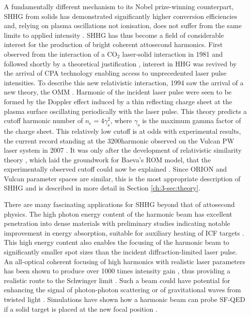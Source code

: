 A fundamentally different mechanism to its Nobel prize-winning counterpart, SHHG from solids has demonstrated significantly higher conversion efficiencies and, relying on plasma oscillations not ionisation, does not suffer from the same limits to applied intensity \cite{teubnerHighorderHarmonicsLaserirradiated2009}. SHHG has thus become a field of considerable interest for the production of bright coherent attosecond harmonics. First observed from the interaction of a CO$_2$ laser-solid interaction in 1981 \cite{carmanVisibleHarmonicEmission1981} and followed shortly by a theoretical justification \cite{bezzeridesPlasmaMechanismUltraviolet1982}, interest in HHG was revived by the arrival of CPA technology enabling access to unprecedented laser pulse intensities. To describe this new relativistic interaction, 1994 saw the arrival of a new theory, the \ac{OMM} \cite{bulanovInteractionUltrashortRelativistically1994}. Harmonic of the incident laser pulse were seen to be formed by the Doppler effect induced by a thin reflecting charge sheet at the plasma surface oscillating periodically with the laser pulse. This theory predicts a cutoff harmonic number of $n_\mathrm{c} = 4\gamma_\mathrm{s}^2 $, where $\gamma_\mathrm{s}$ is the maximum gamma factor of the charge sheet. This relatively low cutoff is at odds with experimental results, the current record standing at the 3200\th harmonic observed on the Vulcan PW laser system in 2007 \cite{dromeyBrightMultikeVHarmonic2007}. It was only after the development of relativistic similarity theory \cite{gordienkoScalingsUltrarelativisticLaser2005}, which laid the groundwork for Baeva's ROM model, that the experimentally observed cutoff could now be explained \cite{baevaTheoryHighorderHarmonic2006}. Since ORION and Vulcan parameter spaces are similar, this is the most appropriate description of SHHG and is described in more detail in Section \ref{ch:3-sec:theory}.

There are many fascinating applications for SHHG beyond that of attosecond physics. The high photon energy content of the harmonic beam has excellent penetration into dense materials with preliminary studies indicating notable improvement in energy absorption, suitable for auxiliary heating of ICF targets \cite{paddockEnergyGainWettedfoam2024}. This high energy content also enables the focusing of the harmonic beam to significantly smaller spot sizes than the incident diffraction-limited laser pulse. An all-optical coherent focusing of high harmonics with realistic laser parameters has been shown to produce over 1000 times intensity gain \cite{vincentiAchievingExtremeLight2019}, thus providing a realistic route to the Schwinger limit \cite{quereReflectingPetawattLasers2021}. Such a beam could have potential for enhancing the signal of photon-photon scattering \cite{aboushelbayaOrbitalAngularMomentum2019} or of gravitational waves from twisted light \cite{atongaGravitationalWavesHighpower2023}. Simulations have shown how a harmonic beam can probe \ac{SF-QED} if a solid target is placed at the new focal position \cite{fedeliProbingStrongfieldQED2020}.

